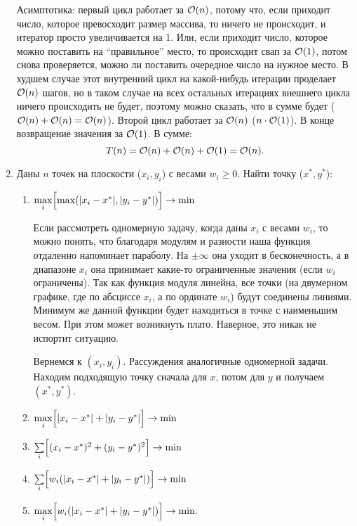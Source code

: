 \begin{enumerate}
\begin{solution}
      Асимптотика: первый цикл работает за $\mathcal{O}(n)$, потому что, если приходит число, которое превосходит размер массива, то ничего не происходит, и итератор просто увеличивается на 1. Или, если приходит число, которое можно поставить на ``правильное'' место, то происходит свап за $\mathcal{O}(1)$, потом снова проверяется, можно ли поставить очередное число на нужное место. В худшем случае этот внутренний цикл на какой-нибудь итерации проделает $\mathcal{O}(n)$ шагов, но в таком случае на всех остальных итерациях внешнего цикла ничего происходить не будет, поэтому можно сказать, что в сумме будет ($\mathcal{O}(n)+\mathcal{O}(n)=\mathcal{O}(n)$). Второй цикл работает за $\mathcal{O}(n)$ ($n \cdot \mathcal{O}(1)$). В конце возвращение значения за $\mathcal{O}(1)$. В сумме:
      \begin{equation}
        T(n) = \mathcal{O}(n) + \mathcal{O}(n) + \mathcal{O}(1) = \mathcal{O}(n).
      \end{equation}
    \end{solution}

  \item
    Даны $n$ точек на плоскости ($x_i, y_i$) с весами $w_i \ge 0$. Найти точку ($x^{*}, y^{*}$):
    \begin{enumerate}
      \item {} $\max\limits_i \Bigl[ \max(|x_i-x^{*}|, |y_i-y^{*}|) \Bigr] \rightarrow \min$
      \begin{solution}
        Если рассмотреть одномерную задачу, когда даны $x_i$ с весами $w_i$, то можно понять, что благодаря модулям и разности наша функция отдаленно напоминает параболу. На $\pm \infty$ она уходит в бесконечность, а в диапазоне $x_i$ она принимает какие-то ограниченные значения (если $w_i$ ограничены). Так как функция модуля линейна, все точки (на двумерном графике, где по абсциссе $x_i$, а по ординате $w_i$) будут соединены линиями. Минимум же данной функции будет находиться в точке с наименьшим весом. При этом может возникнуть плато. Наверное, это никак не испортит ситуацию.

        Вернемся к $(x_i, y_i)$. Рассуждения аналогичные одномерной задачи. Находим подходящую точку сначала для $x$, потом для $y$ и получаем $(x^{*}, y^{*})$.
      \end{solution}
      \item {} $\max\limits_i \Bigl[ |x_i-x^{*}|+|y_i-y^{*}|  \Bigr] \rightarrow \min$
      \item {} $\sum\limits_i \Bigl[ (x_i-x^{*})^2+(y_i-y^{*})^2  \Bigr] \rightarrow \min$
      \item $\sum\limits_i \Bigl[ w_i(|x_i-x^{*}|+|y_i-y^{*}|) \Bigr] \rightarrow \min$
      \item $\max\limits_i \Bigl[ w_i(|x_i-x^{*}|+|y_i-y^{*}|) \Bigr] \rightarrow \min$.
    \end{enumerate}


\end{enumerate}
